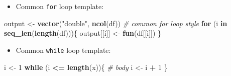 \documentclass[]{book}
\newenvironment{Shaded}{\begin{snugshade}}{\end{snugshade}}
\newcommand{\CommentTok}[1]{\textcolor[rgb]{0.56,0.35,0.01}{\textit{#1}}}
\newcommand{\ControlFlowTok}[1]{\textcolor[rgb]{0.13,0.29,0.53}{\textbf{#1}}}
\newcommand{\DecValTok}[1]{\textcolor[rgb]{0.00,0.00,0.81}{#1}}
\newcommand{\KeywordTok}[1]{\textcolor[rgb]{0.13,0.29,0.53}{\textbf{#1}}}
\newcommand{\NormalTok}[1]{#1}
\newcommand{\OperatorTok}[1]{\textcolor[rgb]{0.81,0.36,0.00}{\textbf{#1}}}
\newcommand{\StringTok}[1]{\textcolor[rgb]{0.31,0.60,0.02}{#1}}
\providecommand{\tightlist}{%
  \setlength{\itemsep}{0pt}\setlength{\parskip}{0pt}}
\theoremstyle{definition}
\theoremstyle{definition}
\theoremstyle{definition}
\theoremstyle{remark}
\begin{document}
\begin{itemize}
\tightlist
\item
  Common \texttt{for} loop template:
\end{itemize}

\begin{Shaded}
\begin{Highlighting}[]
\NormalTok{output <-}\StringTok{ }\KeywordTok{vector}\NormalTok{(}\StringTok{"double"}\NormalTok{, }\KeywordTok{ncol}\NormalTok{(df)) }\CommentTok{# common for loop style  }
\ControlFlowTok{for}\NormalTok{ (i }\ControlFlowTok{in} \KeywordTok{seq_len}\NormalTok{(}\KeywordTok{length}\NormalTok{(df)))\{}
\NormalTok{  output[[i]] <-}\StringTok{ }\KeywordTok{fun}\NormalTok{(df[[i]])}
\NormalTok{  \}  }
\end{Highlighting}
\end{Shaded}

\begin{itemize}
\tightlist
\item
  Common \texttt{while} loop template:
\end{itemize}

\begin{Shaded}
\begin{Highlighting}[]
\NormalTok{i <-}\StringTok{ }\DecValTok{1}
\ControlFlowTok{while}\NormalTok{ (i }\OperatorTok{<=}\StringTok{ }\KeywordTok{length}\NormalTok{(x))\{}
  \CommentTok{# body}
\NormalTok{  i <-}\StringTok{ }\NormalTok{i }\OperatorTok{+}\StringTok{ }\DecValTok{1}
\NormalTok{\}  }
\end{Highlighting}
\end{Shaded}
\end{document}
